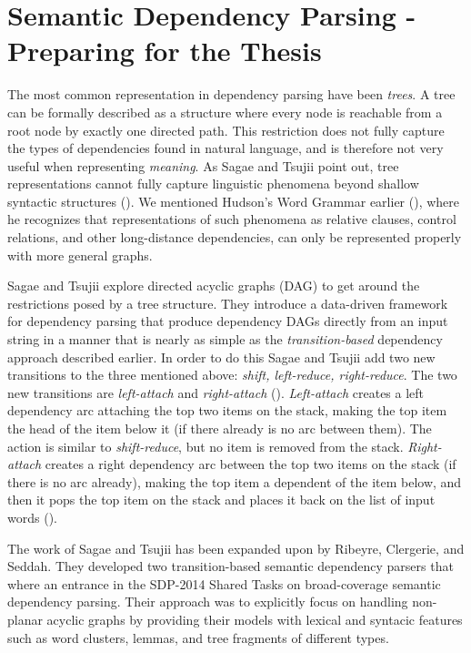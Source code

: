 \documentclass[10pt]{article}
\begin{document}
\section{Semantic Dependency Parsing - Preparing for the Thesis}
The most common representation in dependency parsing have been \textit{trees}. A tree can be formally described as a structure where every node is reachable from a root node by exactly one directed path. This restriction does not fully capture the types of dependencies found in natural language, and is therefore not very useful when representing \textit{meaning}. As Sagae and Tsujii point out, tree representations cannot fully capture linguistic phenomena beyond shallow syntactic structures (\cite{sagae2008shift}). We mentioned Hudson's Word Grammar earlier (\cite{hudson1990english}), where he recognizes that representations of such phenomena as relative clauses, control relations, and other long-distance dependencies, can only be represented properly with more general graphs.

Sagae and Tsujii explore directed acyclic graphs (DAG) to get around the restrictions posed by a tree structure. They introduce a data-driven framework for dependency parsing that produce dependency DAGs directly from an input string in a manner that is nearly as simple as the \textit{transition-based} dependency approach described earlier. In order to do this Sagae and Tsujii add two new transitions to the three mentioned above: \textit{shift, left-reduce, right-reduce}. The two new transitions are \textit{left-attach} and \textit{right-attach} (\cite{sagae2008shift}). \textit{Left-attach} creates a left dependency arc attaching the top two items on the stack, making the top item the head of the item below it (if there already is no arc between them). The action is similar to \textit{shift-reduce}, but no item is removed from the stack. \textit{Right-attach} creates a right dependency arc between the top two items on the stack (if there is no arc already), making the top item a dependent of the item below, and then it pops the top item on the stack and places it back on the list of input words (\cite{sagae2008shift}).

The work of Sagae and Tsujii has been expanded upon by Ribeyre, Clergerie, and Seddah. They developed two transition-based semantic dependency parsers that where an entrance in the SDP-2014 Shared Tasks on broad-coverage semantic dependency parsing. Their approach was to explicitly focus on handling non-planar acyclic graphs by providing their models with lexical and syntacic features such as word clusters, lemmas, and tree fragments of different types. 
\end{document}
